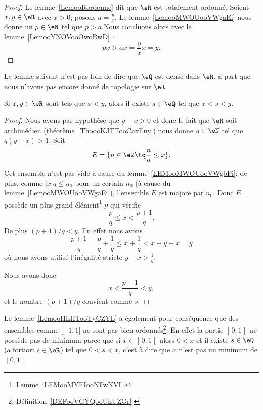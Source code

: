 \begin{proof}
    Le lemme~\ref{LemooRordonne} dit que \( \eR\) est totalement ordonné. Soient \( x,y\in \eR\) avec \( x>0\); posons \( a=\frac{ y }{ x }\). Le lemme~\ref{LemooMWOUooVWgaEi} nous donne un \( p \in \eN\) tel que \(p > a\).Nous concluons alors avec le lemme~\ref{LemooYNOVooOwoRwD} :
    \begin{equation}
        px>ax=\frac{ y }{ x }x=y.
    \end{equation}
\end{proof}

Le lemme suivant n'est pas loin de dire que \( \eQ\) est dense dans \( \eR\), à part que nous n'avons pas encore donné de topologie sur \( \eR\).
\begin{lemma}       \label{LemooHLHTooTyCZYL}
    Si \( x,y\in \eR\) sont tels que \( x<y\), alors il existe \( s\in \eQ\) tel que \( x<s<y\).
\end{lemma}

\begin{proof}
    Nous avons par hypothèse que \( y-x>0\) et donc le fait que \( \eR\) soit archimédien (théorème~\ref{ThoooKJTTooCaxEny}) nous donne \( q\in \eN\) tel que \( q(y-x)>1\). Soit
    \begin{equation}
        E=\{ n\in \eZ\tq \frac{ n }{ q }\leq x \}.
    \end{equation}
    Cet ensemble n'est pas vide à cause du lemme~\ref{LEMooMWOUooVWgbFi}; de plus, comme \( |x|q \leq n_0\) pour un certain \( n_0 \) (à cause du lemme~\ref{LemooMWOUooVWgaEi}), l'ensemble \( E\) est majoré par \( n_0\). Donc \( E\) possède un plus grand élément\footnote{Lemme~\ref{LEMooMYEIooNFwNVI}.} \( p\) qui vérifie
    \begin{equation}
        \frac{ p }{ q }\leq x<\frac{ p+1 }{ q }.
    \end{equation}
    De plus \( (p+1)/q<y\). En effet nous avons
    \begin{equation}
        \frac{ p+1 }{ q }=\frac{ p }{ q }+\frac{1}{ q }\leq x+\frac{1}{ q }<x+y-x=y
    \end{equation}
    où nous avons utilisé l'inégalité stricte \( y-x>\frac{1}{ q }\).

    Nous avons donc
    \begin{equation}
        x<\frac{ p+1 }{ q }<y,
    \end{equation}
    et le nombre \( (p+1)/q\) convient comme \( s\).
\end{proof}

\begin{remark}      \label{REMooXOIOooHjwMvA}
    Le lemme~\ref{LemooHLHTooTyCZYL} a également pour conséquence que des ensembles comme \( \mathopen[ -1 , 1 \mathclose]\) ne sont pas bien ordonnés\footnote{Définition~\ref{DEFooVGYQooUhUZGr}.}. En effet la partie \( \mathopen] 0 , 1 \mathclose[\) ne possède pas de minimum parce que si \( x\in \mathopen] 0 , 1 \mathclose[\) alors \( 0<x\) et il existe \( s\in \eQ\) (a fortiori \( s\in \eR\)) tel que \( 0<s<x\), c'est à dire que \( x\) n'est pas un minimum de \( \mathopen] 0 , 1 \mathclose[\).
\end{remark}

